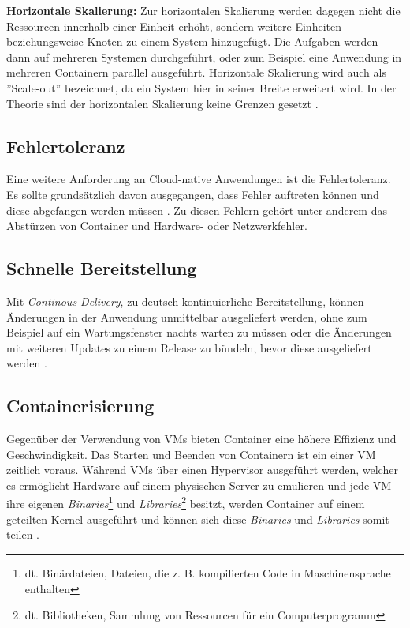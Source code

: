 \textbf{Horizontale Skalierung:}
Zur horizontalen Skalierung werden dagegen nicht die Ressourcen innerhalb einer Einheit erhöht, sondern weitere Einheiten beziehungsweise Knoten zu einem System hinzugefügt. Die Aufgaben werden dann auf mehreren Systemen durchgeführt, oder zum Beispiel eine Anwendung in mehreren Containern parallel ausgeführt. Horizontale Skalierung wird auch als ''Scale-out'' bezeichnet, da ein System hier in seiner Breite erweitert wird. In der Theorie sind der horizontalen Skalierung keine Grenzen gesetzt \cite[Vgl.][]{Geißler2019}\cite[Vgl.][]{VMware}.

\subsection{Fehlertoleranz}
Eine weitere Anforderung an Cloud-native Anwendungen ist die Fehlertoleranz. Es sollte grundsätzlich davon ausgegangen, dass Fehler auftreten können und diese abgefangen werden müssen \cite[Vgl.][S. 17]{Gannon2017}. Zu diesen Fehlern gehört unter anderem das Abstürzen von Container und Hardware- oder Netzwerkfehler.

\subsection{Schnelle Bereitstellung}
Mit \textit{Continous Delivery}, zu deutsch kontinuierliche Bereitstellung, können Änderungen in der Anwendung unmittelbar ausgeliefert werden, ohne zum Beispiel auf ein Wartungsfenster nachts warten zu müssen oder die Änderungen mit weiteren Updates zu einem Release zu bündeln, bevor diese ausgeliefert werden \cite[Vgl.][]{VMwareb}. \pagebreak

\subsection{Containerisierung}
Gegenüber der Verwendung von \acp{VM} bieten Container eine höhere Effizienz und Geschwindigkeit. Das Starten und Beenden von Containern ist ein einer \ac{VM} zeitlich voraus. \cite[Vgl.][]{VMwareb}
Während \acp{VM} über einen Hypervisor ausgeführt werden, welcher es ermöglicht Hardware auf einem physischen Server zu emulieren und jede \ac{VM} ihre eigenen \textit{Binaries}\footnote{dt. Binärdateien, Dateien, die z. B. kompilierten Code in Maschinensprache enthalten} und \textit{Libraries}\footnote{dt. Bibliotheken, Sammlung von Ressourcen für ein Computerprogramm} besitzt, werden Container auf einem geteilten Kernel ausgeführt und können sich diese \textit{Binaries} und \textit{Libraries} somit teilen \cite[Vgl.][]{Jones2018}.

